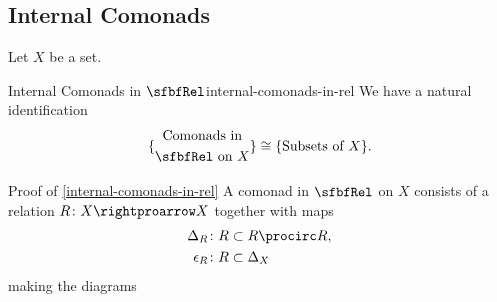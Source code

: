 \subsection{Internal Comonads}\label{subsection-internal-comonads-in-rel}
Let $X$ be a set.
\begin{proposition}{Internal Comonads in $\sfbfRel$}{internal-comonads-in-rel}%
    We have a natural identification
    \[
        \{
            \begin{gathered}
                \text{Comonads in}\\
                \text{$\sfbfRel$ on $X$}
            \end{gathered}
        \}
        \cong
        \{\text{Subsets of $X$}\}.
    \]%
\end{proposition}
\begin{Proof}{Proof of \cref{internal-comonads-in-rel}}%
    A comonad in $\sfbfRel$ on $X$ consists of a relation $R\colon X\rightproarrow X$ together with maps
    \begin{align*}
        \Delta_{R}   &\colon R \subset R\procirc R,\\
        \epsilon_{R} &\colon R \subset \Delta_{X}
    \end{align*}
    making the diagrams
    \begingroup\footnotesize%
    \begin{webcompile}
\end{webcompile}
\end{Proof}
